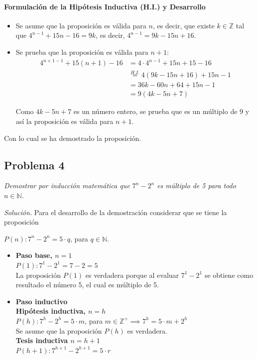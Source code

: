 \documentclass{article}
\begin{document}
\paragraph{Formulación de la Hipótesis Inductiva (H.I.) y Desarrollo}
\begin{itemize}    
    \item Se asume que la proposición es válida para $n$, es decir, que existe $k \in \mathbb{Z}$ tal que $4^{n-1} + 15n - 16 = 9k$, es decir, $4^{n-1} = 9k - 15n + 16$.
    \item Se prueba que la proposición es válida para $n + 1$:
    \begin{align*}
    4^{n+1-1} + 15(n + 1) - 16 &= 4 \cdot 4^{n-1} + 15n + 15 - 16 \\
    &\stackrel{H.I.}{=} 4(9k - 15n + 16) + 15n - 1 \\
    &= 36k - 60n + 64 + 15n - 1 \\
    &= 9(4k - 5n + 7)
    \end{align*}
    
    Como $4k - 5n + 7$ es un número entero, se prueba que es un múltiplo de $9$ y así la proposición es válida para $n + 1$.
\end{itemize}

Con lo cual se ha demostrado la proposición. 

\subsection{Problema 4}
\label{sec:problema-4}

\textit{Demostrar por inducción matemática que $7^n - 2^n$ es múltiplo de 5 para todo $n \in \mathbb{N}$.}
\bigskip

\textit{Solución.} Para el desarrollo de la demostración considerar que se tiene la proposición 

$P(n) : 7^n - 2^n = 5 \cdot q$, para $q \in \mathbb{N}$.
\bigskip
\begin{itemize}
    \item \textbf{Paso base, $n = 1$} \\
$P(1) : 7^1 - 2^1 = 7 - 2 = 5$ \\
La proposición $P(1)$ es verdadera porque al evaluar $7^1 - 2^1$ se obtiene como resultado el número 5, el cual es múltiplo de 5.
\end{itemize}


\begin{itemize} 
\item \textbf{Paso inductivo} \\
\textbf{Hipótesis inductiva, $n = h$} \\
$P(h) : 7^h - 2^h = 5 \cdot m$, para $m \in \mathbb{Z}^+ \implies 7^h = 5 \cdot m + 2^h$ \\
Se asume que la proposición $P(h)$ es verdadera. \\
\textbf{Tesis inductiva $n = h + 1$} \\
$P(h+1) : 7^{h+1} - 2^{h+1} = 5 \cdot r$
\end{itemize}
\end{document}
